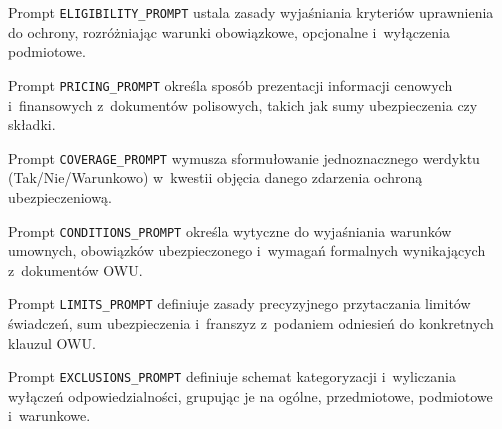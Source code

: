 

Prompt \texttt{ELIGIBILITY\_PROMPT} ustala zasady wyjaśniania kryteriów
uprawnienia do ochrony, rozróżniając warunki obowiązkowe, opcjonalne
i~wyłączenia podmiotowe.



Prompt \texttt{PRICING\_PROMPT} określa sposób prezentacji informacji cenowych
i~finansowych z~dokumentów polisowych, takich jak sumy ubezpieczenia czy
składki.



Prompt \texttt{COVERAGE\_PROMPT} wymusza sformułowanie jednoznacznego werdyktu
(Tak/Nie/Warunkowo) w~kwestii objęcia danego zdarzenia ochroną ubezpieczeniową.



Prompt \texttt{CONDITIONS\_PROMPT} określa wytyczne do wyjaśniania warunków
umownych, obowiązków ubezpieczonego i~wymagań formalnych wynikających
z~dokumentów OWU.



Prompt \texttt{LIMITS\_PROMPT} definiuje zasady precyzyjnego przytaczania
limitów świadczeń, sum ubezpieczenia i~franszyz z~podaniem odniesień do
konkretnych klauzul OWU.



Prompt \texttt{EXCLUSIONS\_PROMPT} definiuje schemat kategoryzacji i~wyliczania
wyłączeń odpowiedzialności, grupując je na ogólne, przedmiotowe, podmiotowe
i~warunkowe.

